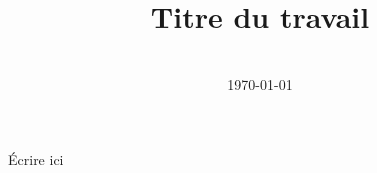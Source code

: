 \documentclass[12pt, a4paper]{article}
\title{Titre du travail}
\author{\JL} %
\date{\US \\ \today} %
\begin{document}
\maketitlepage

Écrire ici

\blankpage

\end{document}
